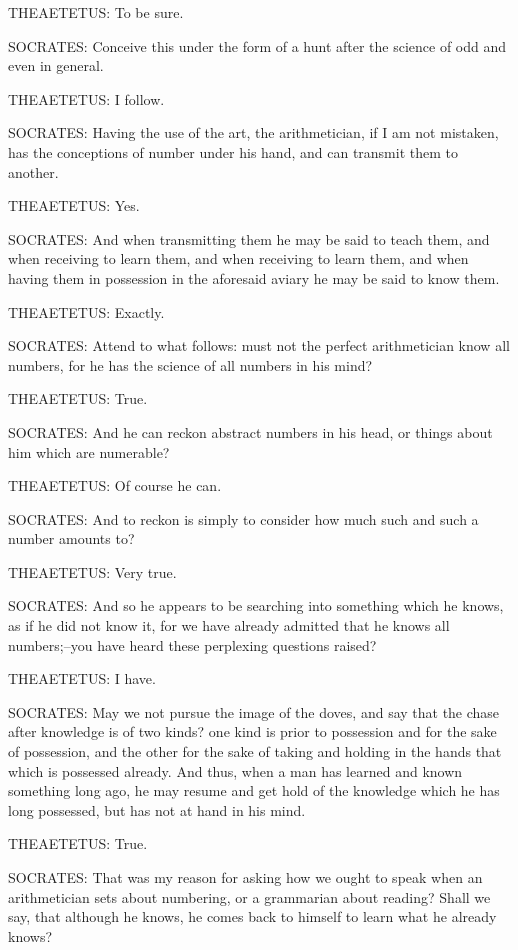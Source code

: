 THEAETETUS: To be sure.

SOCRATES: Conceive this under the form of a hunt after the science of
odd and even in general.

THEAETETUS: I follow.

SOCRATES: Having the use of the art, the arithmetician, if I am not
mistaken, has the conceptions of number under his hand, and can transmit
them to another.

THEAETETUS: Yes.

SOCRATES: And when transmitting them he may be said to teach them, and
when receiving to learn them, and when receiving to learn them, and when
having them in possession in the aforesaid aviary he may be said to know
them.

THEAETETUS: Exactly.

SOCRATES: Attend to what follows: must not the perfect arithmetician
know all numbers, for he has the science of all numbers in his mind?

THEAETETUS: True.

SOCRATES: And he can reckon abstract numbers in his head, or things
about him which are numerable?

THEAETETUS: Of course he can.

SOCRATES: And to reckon is simply to consider how much such and such a
number amounts to?

THEAETETUS: Very true.

SOCRATES: And so he appears to be searching into something which he
knows, as if he did not know it, for we have already admitted that he
knows all numbers;--you have heard these perplexing questions raised?

THEAETETUS: I have.

SOCRATES: May we not pursue the image of the doves, and say that the
chase after knowledge is of two kinds? one kind is prior to possession
and for the sake of possession, and the other for the sake of taking and
holding in the hands that which is possessed already. And thus, when a
man has learned and known something long ago, he may resume and get hold
of the knowledge which he has long possessed, but has not at hand in his
mind.

THEAETETUS: True.

SOCRATES: That was my reason for asking how we ought to speak when an
arithmetician sets about numbering, or a grammarian about reading? Shall
we say, that although he knows, he comes back to himself to learn what
he already knows?

